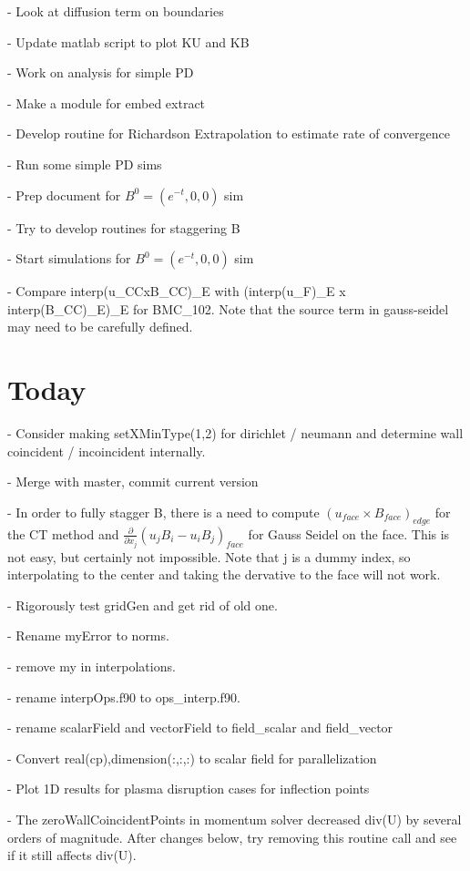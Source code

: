 \documentclass[11pt]{article}
\begin{document}
- Look at diffusion term on boundaries

- Update matlab script to plot KU and KB

- Work on analysis for simple PD

- Make a module for embed extract

- Develop routine for Richardson Extrapolation to estimate rate of convergence

- Run some simple PD sims

- Prep document for $B^0 = (e^{-t},0,0)$ sim

- Try to develop routines for staggering B

- Start simulations for $B^0 = (e^{-t},0,0)$ sim

- Compare interp(u\_CCxB\_CC)\_E with (interp(u\_F)\_E x interp(B\_CC)\_E)\_E for BMC\_102. Note that the source term in gauss-seidel may need to be carefully defined.


\section{Today}

- Consider making setXMinType(1,2) for dirichlet / neumann and determine wall coincident / incoincident internally.

- Merge with master, commit current version

- In order to fully stagger B, there is a need to compute $(u_{face}\times B_{face})_{edge}$ for the CT method and
$\frac{\partial}{\partial x_j} (u_j B_i-u_iB_j)_{face}$ for Gauss Seidel on the face. This is not easy, but certainly not impossible. Note that j is a dummy index, so interpolating to the center and taking the dervative to the face will not work.

- Rigorously test gridGen and get rid of old one.

- Rename myError to norms.

- remove my in interpolations.

- rename interpOps.f90 to ops\_interp.f90.

- rename scalarField and vectorField to field\_scalar and field\_vector

- Convert real(cp),dimension(:,:,:) to scalar field for parallelization

- Plot 1D results for plasma disruption cases for inflection points

- The zeroWallCoincidentPoints in momentum solver decreased div(U) by several orders of magnitude. After changes below, try removing this routine call and see if it still affects div(U).
\end{document}

